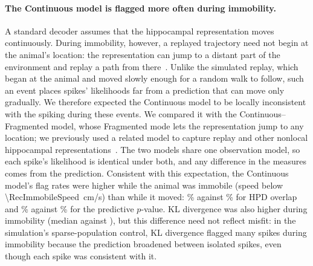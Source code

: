 \documentclass[12pt]{article}
\begin{document}
\paragraph{The Continuous model is flagged more often during immobility.} A standard decoder assumes that the hippocampal representation moves continuously. During immobility, however, a replayed trajectory need not begin at the animal's location: the representation can jump to a distant part of the environment and replay a path from there~\cite{KarlssonAwakereplayremote2009}. Unlike the simulated replay, which began at the animal and moved slowly enough for a random walk to follow, such an event places spikes' likelihoods far from a prediction that can move only gradually. We therefore expected the Continuous model to be locally inconsistent with the spiking during these events. We compared it with the Continuous--Fragmented model, whose Fragmented mode lets the representation jump to any location; we previously used a related model to capture replay and other nonlocal hippocampal representations~\cite{DenovellisHippocampalreplayexperience2021}. The two models share one observation model, so each spike's likelihood is identical under both, and any difference in the measures comes from the prediction. Consistent with this expectation, the Continuous model's flag rates were higher while the animal was immobile (speed below \SI{\RecImmobileSpeed}{cm/s}) than while it moved: \RecHpdFlagRateImmobile\% against \RecHpdFlagRateMoving\% for HPD overlap and \RecPvalueFlagRateImmobile\% against \RecPvalueFlagRateMoving\% for the predictive $p$-value. KL divergence was also higher during immobility (median \RecKlMedianImmobile{} against \RecKlMedianMoving), but this difference need not reflect misfit: in the simulation's sparse-population control, KL divergence flagged many spikes during immobility because the prediction broadened between isolated spikes, even though each spike was consistent with it.
\end{document}
